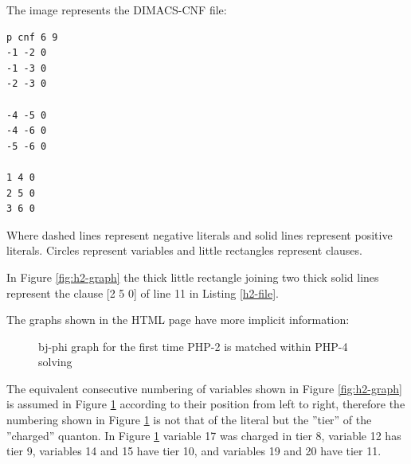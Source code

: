 \documentclass{easychair}
\newcommand{\quanton}{\textsf{quanton}}
\begin{document}
The image represents the DIMACS-CNF file:

\begin{lstlisting}[label=h2-file, caption=PHP of size 2 DIMACS file,]
p cnf 6 9
-1 -2 0
-1 -3 0
-2 -3 0

-4 -5 0
-4 -6 0
-5 -6 0

1 4 0
2 5 0
3 6 0
\end{lstlisting}

Where dashed lines represent negative literals and solid lines represent positive literals. Circles represent variables and little rectangles represent clauses.

In Figure \ref{fig:h2-graph} the thick little rectangle joining two thick solid lines  represent the clause [2 5 0] of line 11 in Listing \ref{h2-file}.

The graphs shown in the HTML page have more implicit information:

\begin{figure}[H]
	\begin{centering}
		\caption{bj-phi graph for the first time PHP-2 is matched within PHP-4 solving}
		\label{fig:h4-f1}
	\end{centering}
\end{figure}

The equivalent consecutive numbering of variables shown in Figure \ref{fig:h2-graph} is assumed in Figure \ref{fig:h4-f1} according to their position from left to right, therefore the numbering shown in Figure \ref{fig:h4-f1} is not that of the literal but the ''tier'' of the ''charged'' {\quanton}. In Figure \ref{fig:h4-f1} variable 17 was charged in tier 8, variable 12 has tier 9, variables 14 and 15 have tier 10, and variables 19 and 20 have tier 11.
\end{document}
